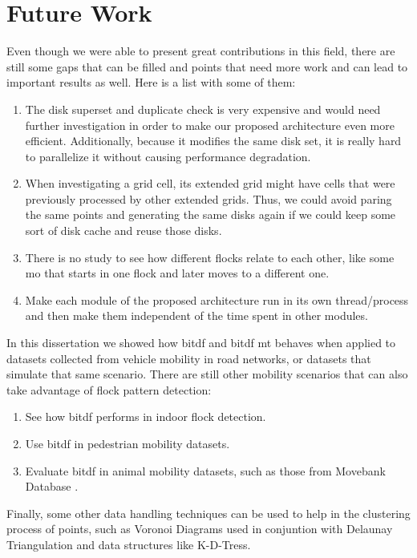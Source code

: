 \section{Future Work}
Even though we were able to present great contributions in this field, there are still some gaps that can be filled and
points that need more work and can lead to important results as well. Here is a list with some of them:

\begin{enumerate}
    \item The disk superset and duplicate check is very expensive and would need further investigation in order to make
        our proposed architecture even more efficient. Additionally, because it modifies the same disk set, it is really
        hard to parallelize it without causing performance degradation.
    \item When investigating a grid cell, its extended grid might have cells that were previously processed by other
        extended grids. Thus, we could avoid paring the same points and generating the same disks again if we could keep
        some sort of disk cache and reuse those disks.
    \item There is no study to see how different flocks relate to each other, like some \ac{mo} that starts in one flock
        and later moves to a different one.
    \item Make each module of the proposed architecture run in its own thread/process and then make them independent of
        the time spent in other modules.
\end{enumerate}

In this dissertation we showed how \ac{bitdf} and \ac{bitdf} \ac{mt} behaves when applied to datasets collected from
vehicle mobility in road networks, or datasets that simulate that same scenario. There are still other mobility
scenarios that can also take advantage of flock pattern detection:

\begin{enumerate}
    \item See how \ac{bitdf} performs in indoor flock detection.
    \item Use \ac{bitdf} in pedestrian mobility datasets.
    \item Evaluate \ac{bitdf} in animal mobility datasets, such as those from Movebank Database \cite{movebank}.
\end{enumerate}

Finally, some other data handling techniques can be used to help in the clustering process of points, such as Voronoi
Diagrams used in conjuntion with Delaunay Triangulation and data structures like K-D-Tress.

